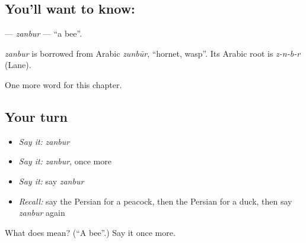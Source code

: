 \subsection*{You'll want to know: }
\textbf{} — \emph{zanbur} — \textquotedblleft{}a bee\textquotedblright{}.

\begin{cousinweb}
\emph{zanbur} is borrowed from Arabic \emph{zunbūr}, \textquotedblleft{}hornet, wasp\textquotedblright{}. Its Arabic root is \emph{z-n-b-r} (Lane).
\end{cousinweb}

\begin{grammarlens}[title={What you've built}]
One more word for this chapter.
\end{grammarlens}

\subsection*{Your turn}
\begin{itemize}
\raggedright
  \item \emph{Say it:} \emph{zanbur}
  \item \emph{Say it:} \emph{zanbur}, once more
  \item \emph{Say it:} say \emph{zanbur}
  \item \emph{Recall:} say the Persian for a peacock, then the Persian for a duck, then say \emph{zanbur} again
\end{itemize}

\begin{tcolorbox}[breakable,colback=teal!4,colframe=teal!35!black,title={Before you move on}]
What does  mean? (\textquotedblleft{}A bee\textquotedblright{}.) Say it once more.
\end{tcolorbox}
